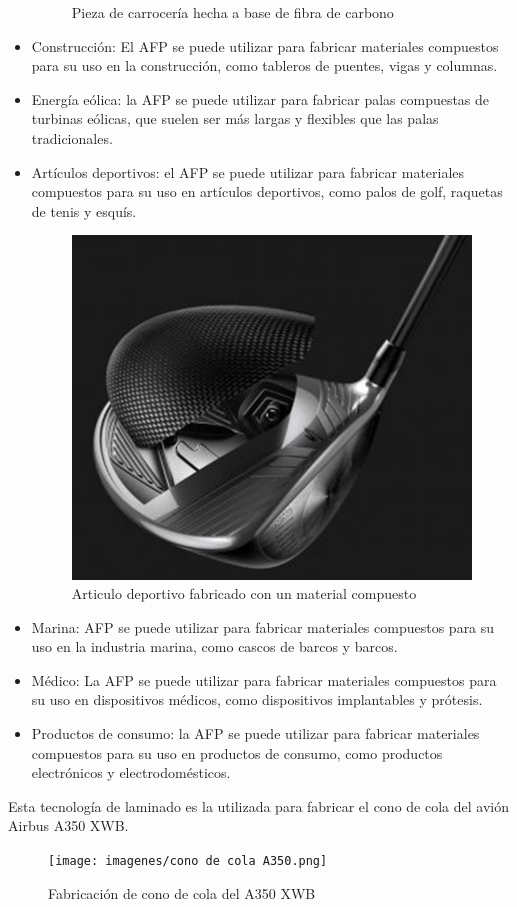 \begin{itemize}
\begin{figure}[H]
        \caption{Pieza de carrocería hecha a base de fibra de carbono}
        \label{fig:enter-label}
    \end{figure}
    \item Construcción: El AFP se puede utilizar para fabricar materiales compuestos para su uso en la construcción, como tableros de puentes, vigas y columnas.
    \item Energía eólica: la AFP se puede utilizar para fabricar palas compuestas de turbinas eólicas, que suelen ser más largas y flexibles que las palas tradicionales.
    \item Artículos deportivos: el AFP se puede utilizar para fabricar materiales compuestos para su uso en artículos deportivos, como palos de golf, raquetas de tenis y esquís.
    \begin{figure}[H]
        \centering
        \includegraphics[width=0.5\linewidth]{Articulo deportivo.png}
        \caption{Articulo deportivo fabricado con un material compuesto}
        \label{fig:enter-label}
    \end{figure}
    \item Marina: AFP se puede utilizar para fabricar materiales compuestos para su uso en la industria marina, como cascos de barcos y barcos.
    \item Médico: La AFP se puede utilizar para fabricar materiales compuestos para su uso en dispositivos médicos, como dispositivos implantables y prótesis.
    \item Productos de consumo: la AFP se puede utilizar para fabricar materiales compuestos para su uso en productos de consumo, como productos electrónicos y electrodomésticos.
\end{itemize}
Esta tecnología de laminado es la utilizada para fabricar el cono de cola del avión Airbus A350 XWB.
\begin{figure}[H]
        \centering
        \texttt{[image: imagenes/cono de cola A350.png]}
        \caption{Fabricación de cono de cola del A350 XWB}
        \label{fig:enter-label}
\end{figure}
    

